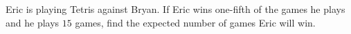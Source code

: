 Eric is playing Tetris against Bryan. If Eric wins one-fifth of the games he plays and he plays $15$ games, find the expected number of games Eric will win.
